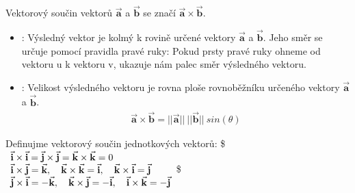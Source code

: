 \documentclass[letterpaper,10pt,english]{jupyterBook}
\begin{document}
\sphinxAtStartPar
{}
Vektorový součin vektorů \(\vec{\mathbf{a}}\) a \(\vec{\mathbf{b}}\) se značí \(\vec{\mathbf{a}} \times \vec{\mathbf{b}}\).

\sphinxAtStartPar
{}
\begin{itemize}
\item {} 
\sphinxAtStartPar
{}: Výsledný vektor je kolmý k rovině určené vektory \(\vec{\mathbf{a}}\) a \(\vec{\mathbf{b}}\). Jeho směr se určuje pomocí pravidla pravé ruky: Pokud prsty pravé ruky ohneme od vektoru u k vektoru v, ukazuje nám palec směr výsledného vektoru.

\end{itemize}

\sphinxAtStartPar
{}
\begin{itemize}
\item {} 
\sphinxAtStartPar
{}: Velikost výsledného vektoru je rovna ploše rovnoběžníku určeného vektory \(\vec{\mathbf{a}}\) a \(\vec{\mathbf{b}}\).
\begin{equation*}
\begin{split} \overrightarrow{\mathbf{a}} \times \overrightarrow{\mathbf{b}} = ||\overrightarrow{\mathbf{a}}||\:||\overrightarrow{\mathbf{b}}||\:sin(\theta) \end{split}
\end{equation*}
\end{itemize}



\sphinxAtStartPar
{}

\sphinxAtStartPar
Definujme vektorový součin jednotkových vektorů:
\$\( \begin{array}{l l}
\vec{\mathbf{i}} \times \vec{\mathbf{i}} = \vec{\mathbf{j}} \times \vec{\mathbf{j}} = \vec{\mathbf{k}} \times \vec{\mathbf{k}} = 0 \\
\vec{\mathbf{i}} \times \vec{\mathbf{j}} = \vec{\mathbf{k}}, \quad \vec{\mathbf{k}} \times \vec{\mathbf{k}} = \vec{\mathbf{i}}, \quad \vec{\mathbf{k}} \times \vec{\mathbf{i}} = \vec{\mathbf{j}} \\
\vec{\mathbf{j}} \times \vec{\mathbf{i}} = -\vec{\mathbf{k}}, \quad \vec{\mathbf{k}} \times \vec{\mathbf{j}}= -\vec{\mathbf{i}}, \quad \vec{\mathbf{i}} \times \vec{\mathbf{k}} = -\vec{\mathbf{j}}
\end{array} \)\$
\end{document}
